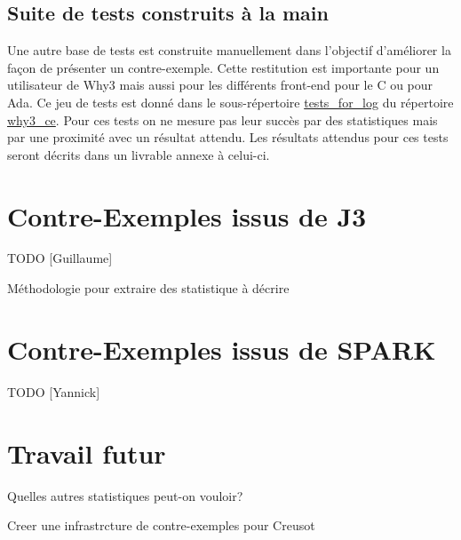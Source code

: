 \documentclass[a4paper,11pt]{article}
\begin{document}
\subsection{Suite de tests construits à la main}

Une autre base de tests est construite manuellement dans l'objectif
d'améliorer la façon de présenter un contre-exemple. Cette restitution
est importante pour un utilisateur de Why3 mais aussi pour les
différents front-end pour le C ou pour Ada. Ce jeu de tests est donné
dans le sous-répertoire \url{tests_for_log} du répertoire
\url{why3_ce}. Pour ces tests on ne mesure pas leur succès par des
statistiques mais par une proximité avec un résultat attendu. Les
résultats attendus pour ces tests seront décrits dans un livrable
annexe à celui-ci. %

\section{Contre-Exemples issus de J3}

TODO [Guillaume]

Méthodologie pour extraire des statistique à décrire

\section{Contre-Exemples issus de SPARK}

TODO [Yannick]


\section{Travail futur}

Quelles autres statistiques peut-on vouloir?

Creer une infrastrcture de contre-exemples pour Creusot

\clearpage



%
\end{document}
